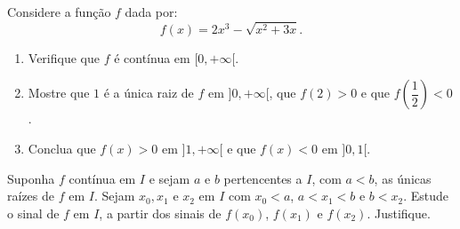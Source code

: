 \begin{exercicio}[14]
Considere a função $f$ dada por:
\[
f(x) = 2x^3 - \sqrt{x^2 + 3x}.
\]
\begin{enumerate}[label=\alph*)]
    \item Verifique que $f$ é contínua em $[0, +\infty[$.
    \item Mostre que $1$ é a única raiz de $f$ em ${]0, +\infty[}$, que $f(2) > 0$ e que $f\!\left(\dfrac{1}{2}\right) < 0$.
    \item Conclua que $f(x) > 0$ em ${]1, +\infty[}$ e que $f(x) < 0$ em ${]0, 1[}$.
\end{enumerate}
\end{exercicio}

\begin{exercicio}[15]
Suponha $f$ contínua em $I$ e sejam $a$ e $b$ pertencentes a $I$, com $a < b$, as únicas raízes de $f$ em $I$. Sejam $x_0, x_1 \text{ e } x_2$ em $I$ com $x_0 < a$, $a < x_1 < b$ e $b < x_2$. Estude o sinal de $f$ em $I$, a partir dos sinais de $f(x_0)$, $f(x_1)$ e $f(x_2)$. Justifique.
\end{exercicio}
